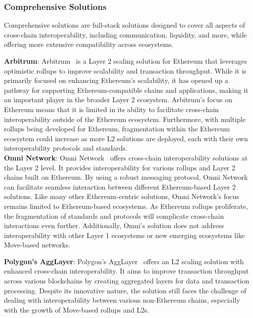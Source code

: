 \subsubsection{Comprehensive Solutions}

Comprehensive solutions are full-stack solutions designed to cover all aspects of cross-chain interoperability, including communication, liquidity, and more, while offering more extensive compatibility across ecosystems.

\textbf{Arbitrum}: Arbitrum~\cite{arbitrum} is a Layer 2 scaling solution for Ethereum that leverages optimistic rollups to improve scalability and transaction throughput. While it is primarily focused on enhancing Ethereum's scalability, it has opened up a pathway for supporting Ethereum-compatible chains and applications, making it an important player in the broader Layer 2 ecosystem. Arbitrum's focus on Ethereum means that it is limited in its ability to facilitate cross-chain interoperability outside of the Ethereum ecosystem. Furthermore, with multiple rollups being developed for Ethereum, fragmentation within the Ethereum ecosystem could increase as more L2 solutions are deployed, each with their own interoperability protocols and standards.
\\

\textbf{Omni Network}: Omni Network~\cite{omni} offers cross-chain interoperability solutions at the Layer 2 level. It provides interoperability for various rollups and Layer 2 chains built on Ethereum. By using a robust messaging protocol, Omni Network can facilitate seamless interaction between different Ethereum-based Layer 2 solutions. Like many other Ethereum-centric solutions, Omni Network's focus remains limited to Ethereum-based ecosystems. As Ethereum rollups proliferate, the fragmentation of standards and protocols will complicate cross-chain interactions even further. Additionally, Omni's solution does not address interoperability with other Layer 1 ecosystems or new emerging ecosystems like Move-based networks.

\textbf{Polygon’s AggLayer}: Polygon’s AggLayer~\cite{aggglayer} offers an L2 scaling solution with enhanced cross-chain interoperability. It aims to improve transaction throughput across various blockchains by creating aggregated layers for data and transaction processing. Despite its innovative nature, the solution still faces the challenge of dealing with interoperability between various non-Ethereum chains, especially with the growth of Move-based rollups and L2s.

